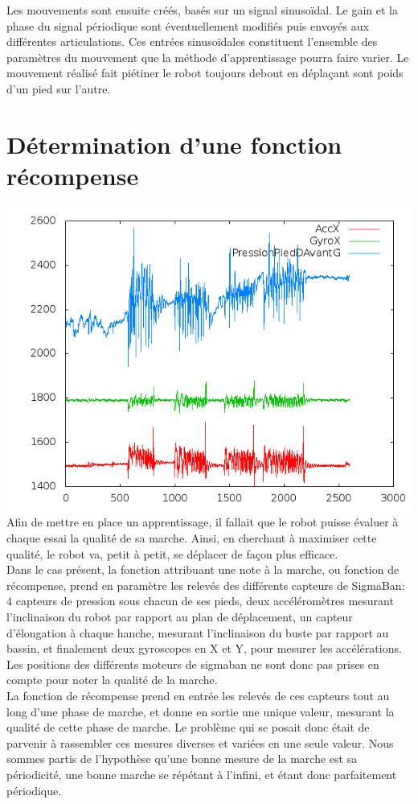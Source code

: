 \documentclass[11pt]{article}
\begin{document}
Les mouvements sont ensuite créés, basés sur un signal sinusoïdal. Le gain et la phase du signal périodique 
sont éventuellement modifiés puis envoyés aux différentes articulations. Ces entrées sinusoïdales constituent l'ensemble des paramètres du mouvement que la méthode d'apprentissage pourra faire varier. Le mouvement réalisé fait piétiner le robot 
toujours debout en déplaçant sont poids d'un pied sur l'autre.

\section{Détermination d'une fonction récompense}
\includegraphics[scale=0.4]{sensors.png}
Afin de mettre en place un apprentissage, il fallait que le robot puisse évaluer à chaque essai la qualité de sa marche. Ainsi, en cherchant à maximiser cette qualité, le robot va, petit à petit, se déplacer de façon plus efficace.\\
Dans le cas présent, la fonction attribuant une note à la marche, ou fonction de récompense, prend en paramètre les relevés des différents capteurs de SigmaBan: 4 capteurs de pression sous chacun de ses pieds, deux accéléromètres mesurant l'inclinaison du robot par rapport au plan de déplacement, un capteur d'élongation à chaque hanche, mesurant l'inclinaison du buste par rapport au bassin, et finalement deux gyroscopes en X et Y, pour mesurer les accélérations. Les positions des différents moteurs de sigmaban ne sont donc pas prises en compte pour noter la qualité de la marche.\\
La fonction de récompense prend en entrée les relevés de ces capteurs tout au long d'une phase de marche, et donne en sortie une unique valeur, mesurant la qualité de cette phase de marche. Le problème qui se posait donc était de parvenir à rassembler ces mesures diverses et variées en une seule valeur. Nous sommes partis de l'hypothèse qu'une bonne mesure de la marche est sa périodicité, une bonne marche se répétant à l'infini, et étant donc parfaitement périodique.\\
\end{document}

